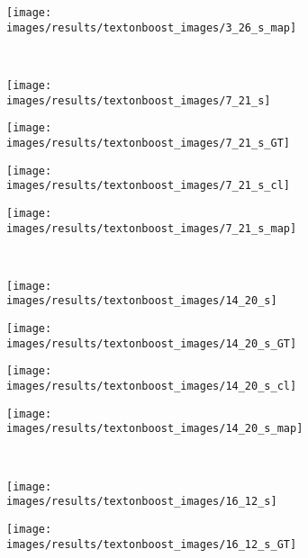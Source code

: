 \begin{figure}[t]
\begin{subfigure}[c]{0.24\textwidth}
  \centering
  \texttt{[image: images/results/textonboost\_images/3\_26\_s\_map]}
 \end{subfigure}
 \\
 \begin{subfigure}[c]{0.24\textwidth}
  \centering
  \texttt{[image: images/results/textonboost\_images/7\_21\_s]}
 \end{subfigure}
 \begin{subfigure}[c]{0.24\textwidth}
  \centering
  \texttt{[image: images/results/textonboost\_images/7\_21\_s\_GT]}
 \end{subfigure}
 \begin{subfigure}[c]{0.24\textwidth}
  \centering
  \texttt{[image: images/results/textonboost\_images/7\_21\_s\_cl]}
 \end{subfigure}
 \begin{subfigure}[c]{0.24\textwidth}
  \centering
  \texttt{[image: images/results/textonboost\_images/7\_21\_s\_map]}
 \end{subfigure}
 \\
 \begin{subfigure}[c]{0.24\textwidth}
  \centering
  \texttt{[image: images/results/textonboost\_images/14\_20\_s]}
 \end{subfigure}
 \begin{subfigure}[c]{0.24\textwidth}
  \centering
  \texttt{[image: images/results/textonboost\_images/14\_20\_s\_GT]}
 \end{subfigure}
 \begin{subfigure}[c]{0.24\textwidth}
  \centering
  \texttt{[image: images/results/textonboost\_images/14\_20\_s\_cl]}
 \end{subfigure}
 \begin{subfigure}[c]{0.24\textwidth}
  \centering
  \texttt{[image: images/results/textonboost\_images/14\_20\_s\_map]}
 \end{subfigure}
 \\
 \begin{subfigure}[c]{0.24\textwidth}
  \centering
  \texttt{[image: images/results/textonboost\_images/16\_12\_s]}
 \end{subfigure}
 \begin{subfigure}[c]{0.24\textwidth}
  \centering
  \texttt{[image: images/results/textonboost\_images/16\_12\_s\_GT]}
 \end{subfigure}
 \begin{subfigure}[c]{0.24\textwidth}

\end{subfigure}
\end{figure}
